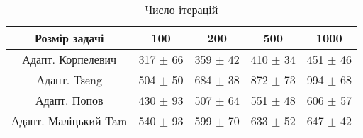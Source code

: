 \begin{table}[H]
	\centering
	\begin{tabular}{|c||c|c|c|c|}\hline
		Розмір задачі & 100 & 200 & 500 & 1000 \\ \hline \hline
		Адапт. Корпелевич & 317 $\pm$ 66 & 359 $\pm$ 42 & 410 $\pm$ 34 & 451 $\pm$ 46 \\ \hline
		Адапт. Tseng & 504 $\pm$ 50 & 684 $\pm$ 38 & 872 $\pm$ 73 & 994 $\pm$ 68 \\ \hline
		Адапт. Попов & 430 $\pm$ 93 & 507 $\pm$ 64 & 551 $\pm$ 48 & 606 $\pm$ 57 \\ \hline
		Адапт. Маліцький Tam & 540 $\pm$ 93 & 599 $\pm$ 70 & 633 $\pm$ 52 & 647 $\pm$ 42 \\ \hline
	\end{tabular}
	\caption{Число ітерацій}
\end{table}
